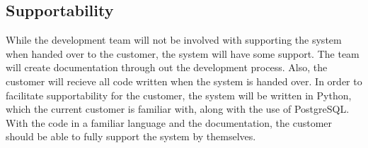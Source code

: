 \subsection{Supportability}
While the development team will not be involved with supporting the system when handed over to the customer, the system will have some support.  The team will create documentation through out the development process. Also, the customer will recieve all code written when the system is handed over.  In order to facilitate supportability for the customer, the system will be written in Python, which the current customer is familiar with, along with the use of PostgreSQL.  With the code in a familiar language and the documentation, the customer should be able to fully support the system by themselves.
